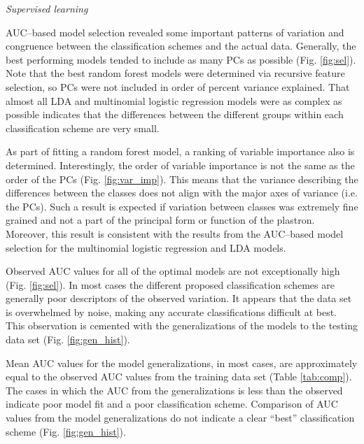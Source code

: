\documentclass[12pt,letterpaper]{article}
\renewcommand{\subsection}[1]{%
\bigskip
\begin{center}
\begin{large}
\normalfont\itshape #1
\end{large}
\end{center}}
\begin{document}
\subsection{Supervised learning}
AUC--based model selection revealed some important patterns of variation and congruence between the classification schemes and the actual data. Generally, the best performing models tended to include as many PCs as possible (Fig. \ref{fig:sel}). Note that the best random forest models were determined via recursive feature selection, so PCs were not included in order of percent variance explained. That almost all LDA and multinomial logistic regression models were as complex as possible indicates that the differences between the different groups within each classification scheme are very small.

As part of fitting a random forest model, a ranking of variable importance also is determined. Interestingly, the order of variable importance is not the same as the order of the PCs (Fig. \ref{fig:var_imp}). This means that the variance describing the differences between the classes does not align with the major axes of variance (i.e. the PCs). Such a result is expected if variation between classes was extremely fine grained and not a part of the principal form or function of the plastron. Moreover, this result is consistent with the results from the AUC--based model selection for the multinomial logistic regression and LDA models.

Observed AUC values for all of the optimal models are not exceptionally high (Fig. \ref{fig:sel}). In most cases the different proposed classification schemes are generally poor descriptors of the observed variation. It appears that the data set is overwhelmed by noise, making any accurate classifications difficult at best. This observation is cemented with the generalizations of the models to the testing data set (Fig. \ref{fig:gen_hist}).

Mean AUC values for the model generalizations, in most cases, are approximately equal to the observed AUC values from the training data set (Table \ref{tab:comp}). The  cases in which the AUC from the  generalizations is less than the observed indicate poor model fit and a poor classification scheme. Comparison of AUC values from the model generalizations do not indicate a clear ``best'' classification scheme (Fig. \ref{fig:gen_hist}). 
\end{document}
